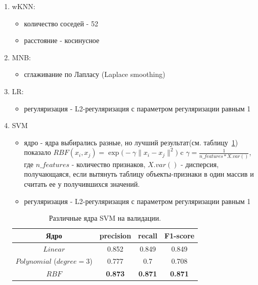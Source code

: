 \documentclass{article}
\begin{document}
\begin{enumerate}
    \item wKNN: 
    \begin{itemize}
        \item количество соседей - 52
        \item расстояние -  косинусное
    \end{itemize}

    \item MNB: 
    \begin{itemize}
        \item сглаживание по Лапласу (Laplace smoothing)
    \end{itemize}

    \item LR:
    \begin{itemize}
        \item регуляризация - L2-регуляризация с параметром регуляризации равным 1
    \end{itemize}
    \item SVM
    \begin{itemize}
        \item ядро - ядра выбирались разные, но лучший результат(см. таблицу~\ref{table:table2}) показало $RBF(x_i, x_j) = \exp \bigl( -\gamma{\|x_i -  x_j\|^2}\bigr)$ c $\gamma = \frac{1}{n\_features * X.var()}$, где $n\_features$ - количество признаков, $X.var()$ - дисперсия, получающаяся, если вытянуть таблицу объекты-признаки в один массив и считать ее у получившихся значений.
        \item регуляризация - L2-регуляризация с параметром регуляризации равным 1
    
    \end{itemize}
    \begin{table}[h!]
        \centering
        \begin{tabular}{|c|c|c|c|}
            \hline
                Ядро & precision & recall & F1-score\\
            \hline
                 $Linear$ & 0.852 &  0.849 & 0.849\\
            \hline
                $Polynomial$ ($degree = 3$)  &  0.777 & 0.7 & 0.708\\
            \hline
                $RBF$ & \bfseries{0.873} &  \bfseries{0.871} & \bfseries{0.871} \\
            \hline
        \end{tabular}
        \caption{Различные ядра SVM на валидации.}
        \label{table:table2}
        \end{table}
\end{enumerate}
\end{document}
